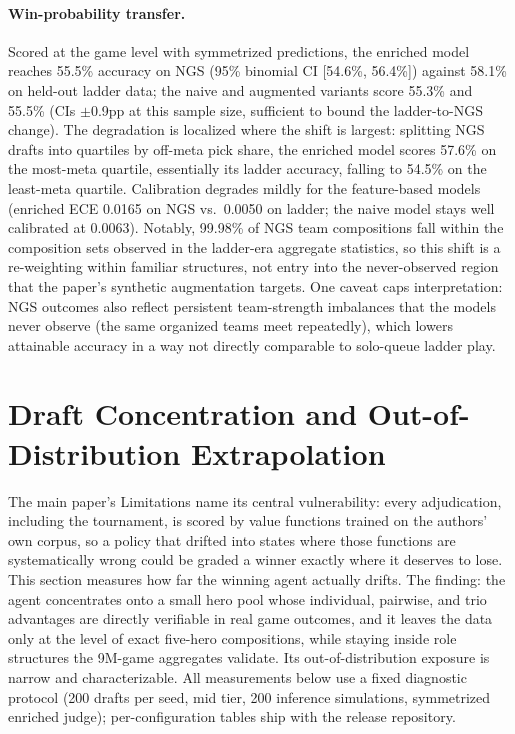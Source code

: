 \documentclass[journal]{IEEEtran}
\begin{document}
\paragraph{Win-probability transfer.} Scored at the game level with symmetrized predictions, the enriched model reaches 55.5\% accuracy on NGS (95\% binomial CI [54.6\%, 56.4\%]) against 58.1\% on held-out ladder data; the naive and augmented variants score 55.3\% and 55.5\% (CIs $\pm$0.9pp at this sample size, sufficient to bound the ladder-to-NGS change). The degradation is localized where the shift is largest: splitting NGS drafts into quartiles by off-meta pick share, the enriched model scores 57.6\% on the most-meta quartile, essentially its ladder accuracy, falling to 54.5\% on the least-meta quartile. Calibration degrades mildly for the feature-based models (enriched ECE 0.0165 on NGS vs.\ 0.0050 on ladder; the naive model stays well calibrated at 0.0063). Notably, 99.98\% of NGS team compositions fall within the composition sets observed in the ladder-era aggregate statistics, so this shift is a re-weighting within familiar structures, not entry into the never-observed region that the paper's synthetic augmentation targets. One caveat caps interpretation: NGS outcomes also reflect persistent team-strength imbalances that the models never observe (the same organized teams meet repeatedly), which lowers attainable accuracy in a way not directly comparable to solo-queue ladder play.

\section{Draft Concentration and Out-of-Distribution Extrapolation}
\label{sec:concentration}

The main paper's Limitations name its central vulnerability: every adjudication, including the tournament, is scored by value functions trained on the authors' own corpus, so a policy that drifted into states where those functions are systematically wrong could be graded a winner exactly where it deserves to lose. This section measures how far the winning agent actually drifts. The finding: the agent concentrates onto a small hero pool whose individual, pairwise, and trio advantages are directly verifiable in real game outcomes, and it leaves the data only at the level of exact five-hero compositions, while staying inside role structures the 9M-game aggregates validate. Its out-of-distribution exposure is narrow and characterizable. All measurements below use a fixed diagnostic protocol (200 drafts per seed, mid tier, 200 inference simulations, symmetrized enriched judge); per-configuration tables ship with the release repository.
\end{document}
